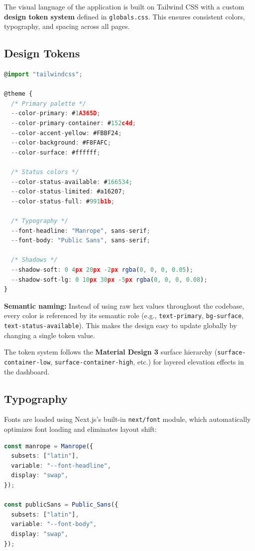 \documentclass[12pt,a4paper]{article}
\begin{document}
The visual language of the application is built on Tailwind CSS with a custom \textbf{design token system} defined in \texttt{globals.css}. This ensures consistent colors, typography, and spacing across all pages.

\subsection{Design Tokens}

\begin{lstlisting}[language=TypeScript,title={globals.css — Custom design tokens (trimmed)}]
@import "tailwindcss";

@theme {
  /* Primary palette */
  --color-primary: #1A365D;
  --color-primary-container: #152c4d;
  --color-accent-yellow: #FBBF24;
  --color-background: #F8FAFC;
  --color-surface: #ffffff;

  /* Status colors */
  --color-status-available: #166534;
  --color-status-limited: #a16207;
  --color-status-full: #991b1b;

  /* Typography */
  --font-headline: "Manrope", sans-serif;
  --font-body: "Public Sans", sans-serif;

  /* Shadows */
  --shadow-soft: 0 4px 20px -2px rgba(0, 0, 0, 0.05);
  --shadow-soft-lg: 0 10px 30px -5px rgba(0, 0, 0, 0.08);
}
\end{lstlisting}

\textbf{Semantic naming:} Instead of using raw hex values throughout the codebase, every color is referenced by its semantic role (e.g., \texttt{text-primary}, \texttt{bg-surface}, \texttt{text-status-available}). This makes the design easy to update globally by changing a single token value.

The token system follows the \textbf{Material Design 3} surface hierarchy (\texttt{surface-container-low}, \texttt{surface-container-high}, etc.) for layered elevation effects in the dashboard.

\subsection{Typography}

Fonts are loaded using Next.js's built-in \texttt{next/font} module, which automatically optimizes font loading and eliminates layout shift:

\begin{lstlisting}[language=TypeScript,title={layout.tsx — Font loading with CSS variables}]
const manrope = Manrope({
  subsets: ["latin"],
  variable: "--font-headline",
  display: "swap",
});

const publicSans = Public_Sans({
  subsets: ["latin"],
  variable: "--font-body",
  display: "swap",
});
\end{lstlisting}
\end{document}
